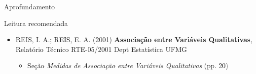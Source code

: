 \documentclass{beamer}
\begin{document}
\begin{frame}{Aprofundamento}
  \begin{block}{Leitura recomendada}
    \footnotesize
    \begin{itemize}
    \item REIS, I. A.; REIS, E. A. (2001) {\bf Associação entre Variáveis Qualitativas}, Relatório Técnico RTE-05/2001 Dept Estatística UFMG
      \begin{itemize}
        \scriptsize
      \item Seção {\em Medidas de Associação entre Variáveis Qualitativas} (pp. 20)
      \end{itemize}
    \end{itemize}
  \end{block}
\end{frame}
\end{document}
